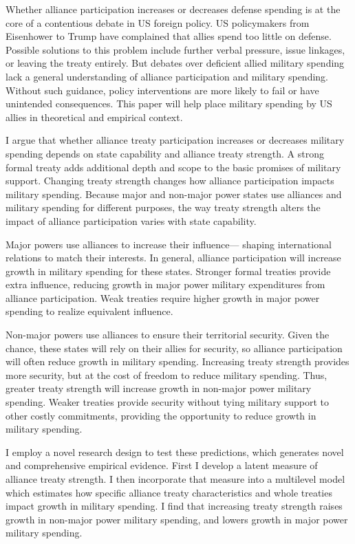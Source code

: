 \documentclass[12pt]{article}
\begin{document}
Whether alliance participation increases or decreases defense spending is at the core of a contentious debate in US foreign policy. 
US policymakers from Eisenhower to Trump have complained that allies spend too little on defense. 
Possible solutions to this problem include further verbal pressure, issue linkages, or leaving the treaty entirely. 
But debates over deficient allied military spending lack a general understanding of alliance participation and military spending. 
Without such guidance, policy interventions are more likely to fail or have unintended consequences. 
This paper will help place military spending by US allies in theoretical and empirical context.


I argue that whether alliance treaty participation increases or decreases military spending depends on state capability and alliance treaty strength. 
A strong formal treaty adds additional depth and scope to the basic promises of military support. 
Changing treaty strength changes how alliance participation impacts military spending. 
Because major and non-major power states use alliances and military spending for different purposes, the way treaty strength alters the impact of alliance participation varies with state capability. 


Major powers use alliances to increase their influence--- shaping international relations to match their interests.
In general, alliance participation will increase growth in military spending for these states.  
Stronger formal treaties provide extra influence, reducing growth in major power military expenditures from alliance participation. 
Weak treaties require higher growth in major power spending to realize equivalent influence. 


Non-major powers use alliances to ensure their territorial security.
Given the chance, these states will rely on their allies for security, so alliance participation will often reduce growth in military spending.   
Increasing treaty strength provides more security, but at the cost of freedom to reduce military spending. 
Thus, greater treaty strength will increase growth in non-major power military spending. 
Weaker treaties provide security without tying military support to other costly commitments, providing the opportunity to reduce growth in military spending. 


I employ a novel research design to test these predictions, which generates novel and comprehensive empirical evidence.
First I develop a latent measure of alliance treaty strength. 
I then incorporate that measure into a multilevel model which estimates how specific alliance treaty characteristics and whole treaties impact growth in military spending.
I find that increasing treaty strength raises growth in non-major power military spending, and lowers growth in major power military spending. 
\end{document}
